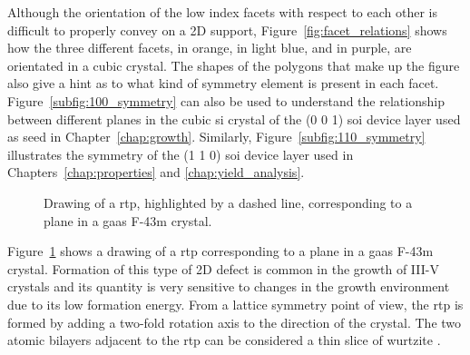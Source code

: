 Although the orientation of the low index facets with respect to each other is difficult to properly convey on a 2D support, Figure~\ref{fig:facet_relations} shows how the three different facets,  in orange,  in light blue, and  in purple, are orientated in a cubic crystal. The shapes of the polygons that make up the figure also give a hint as to what kind of symmetry element is present in each facet. Figure~\ref{subfig:100_symmetry} can also be used to understand the relationship between different planes in the cubic \acl{si} crystal of the \hkl(0 0 1) \acf{soi} device layer used as seed in Chapter~\ref{chap:growth}. Similarly, Figure~\ref{subfig:110_symmetry} illustrates the symmetry of the \hkl(1 1 0) \acs{soi} device layer used in Chapters~\ref{chap:properties} and \ref{chap:yield_analysis}.

\begin{figure}
    \centering
    \caption[Drawing of a  \acl{rtp} in a F-43m crystal.]{Drawing of a \acl{rtp}, highlighted by a dashed line, corresponding to a  plane in a \acs{gaas} F-43m crystal.}
    \label{fig:GaAs_rtp}
\end{figure}

Figure~\ref{fig:GaAs_rtp} shows a drawing of a \acf{rtp} corresponding to a  plane in a \acs{gaas} F-43m crystal. Formation of this type of 2D defect is common in the growth of III-V crystals \cite{Borg2017} and its quantity is very sensitive to changes in the growth environment \cite{Algra2008, Chi2013} due to its low formation energy. From a lattice symmetry point of view, the \acs{rtp} is formed by adding a two-fold rotation axis to the  direction of the crystal. The two atomic bilayers adjacent to the \acs{rtp} can be considered a thin slice of wurtzite \cite{Glas2007, Vedel2022}.












